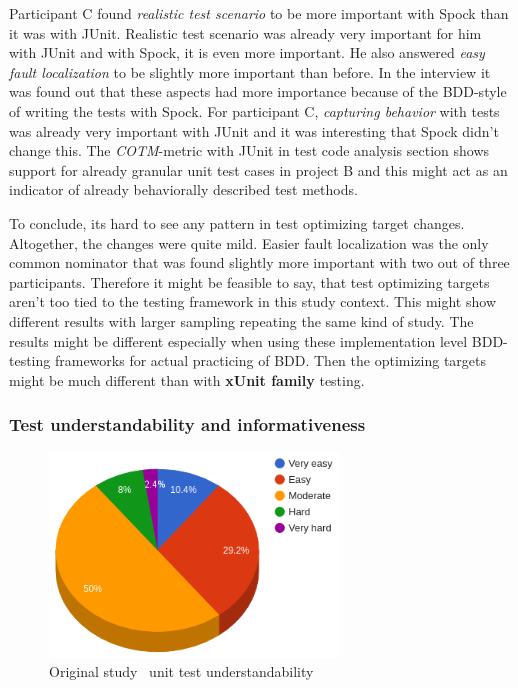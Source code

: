 Participant C found \textit{realistic test
scenario} to be more important with Spock than it was with JUnit. Realistic test scenario was already very important for him
with JUnit and with Spock, it is even more important. He also answered \textit{easy fault localization} to be slightly
more important than before. In the interview it was found out that these aspects had more importance because of the BDD-style of writing
the tests with Spock. For participant C, \textit{capturing behavior} with tests was already very important with JUnit and it was
interesting that Spock didn't change this. The \textit{COTM}-metric with JUnit in test code analysis section shows support
for already granular unit test cases in project B and this might act as an indicator of already behaviorally described test methods.

To conclude, its hard to see any pattern in test optimizing target changes. Altogether, the changes were quite mild.
Easier fault localization was the only common nominator that was found slightly more important with two out of three
participants. Therefore it might be feasible to say, that test optimizing targets aren't too tied to the testing framework in this study context.
This might show different results with larger sampling repeating the same kind of study. The results might be different especially when using these
implementation level BDD-testing frameworks for actual practicing of BDD. Then the optimizing targets might be much different
than with \textbf{xUnit family} testing.

\subsubsection{Test understandability and informativeness }

    \begin{figure}[H]
      \begin{center}
        \includegraphics[width=7.7cm]{images/org-understandability.png}
        \caption{Original study~\cite{li2016automatically} unit test understandability}
        \label{fig:org-understandability}
      \end{center}
    \end{figure}

